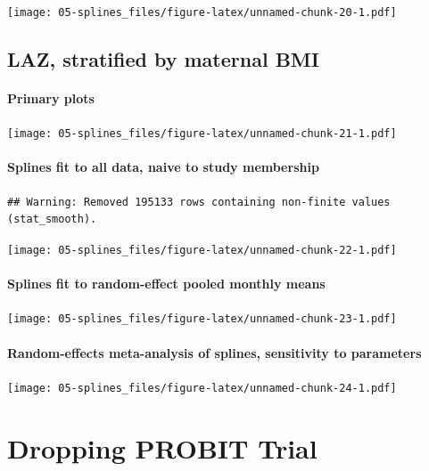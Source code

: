 \documentclass[9pt,]{book}
\begin{document}
\texttt{[image: 05-splines\_files/figure-latex/unnamed-chunk-20-1.pdf]}

\section{LAZ, stratified by maternal
BMI}\label{laz-stratified-by-maternal-bmi}

\subsubsection{Primary plots}\label{primary-plots-5}

\texttt{[image: 05-splines\_files/figure-latex/unnamed-chunk-21-1.pdf]}

\subsubsection{Splines fit to all data, naive to study
membership}\label{splines-fit-to-all-data-naive-to-study-membership-5}

\begin{verbatim}
## Warning: Removed 195133 rows containing non-finite values (stat_smooth).
\end{verbatim}

\texttt{[image: 05-splines\_files/figure-latex/unnamed-chunk-22-1.pdf]}

\subsubsection{Splines fit to random-effect pooled monthly
means}\label{splines-fit-to-random-effect-pooled-monthly-means-5}

\texttt{[image: 05-splines\_files/figure-latex/unnamed-chunk-23-1.pdf]}

\subsubsection{Random-effects meta-analysis of splines, sensitivity to
parameters}\label{random-effects-meta-analysis-of-splines-sensitivity-to-parameters-5}

\texttt{[image: 05-splines\_files/figure-latex/unnamed-chunk-24-1.pdf]}

\chapter{Dropping PROBIT Trial}\label{no-PROBIT}

\raggedright
\end{document}
